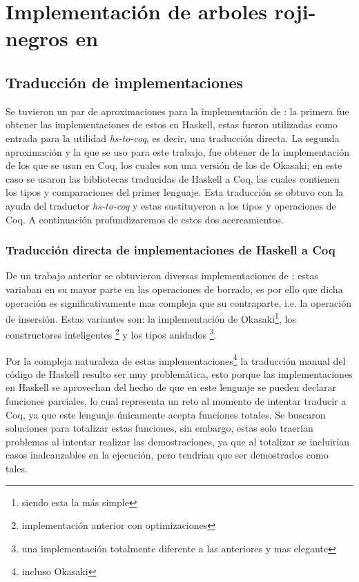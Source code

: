 \chapter{Implementación de arboles roji-negros en {\coq}}

\section{Traducción de implementaciones}
Se tuvieron un par de aproximaciones para la implementación de {\arns}: la primera fue obtener las
implementaciones de estos \cite{tesisG} en Haskell, estas fueron utilizadas como entrada para la
utilidad \textit{hs-to-coq}, es decir, una traducci\'on directa. La segunda aproximación y la que
se uso para este trabajo, fue obtener de \cite{MSetRBT} la implementaci\'on de los {\arns} que se
usan en Coq, los cuales son una versi\'on de los {\arns} de Okasaki; en este caso se usaron
las bibliotecas traducidas de Haskell a Coq, las cuales contienen los tipos y comparaciones del
primer lenguaje. Esta traducción se obtuvo con la ayuda del traductor \textit{hs-to-coq} y estas
sustituyeron a los tipos y operaciones de Coq. A continuación profundizaremos de estos 
dos acercamientos.

\subsection{Traducción directa de implementaciones de Haskell a Coq}
De un trabajo anterior \cite{tesisG} se obtuvieron diversas implementaciones de {\arns}; estas
variaban en su mayor parte en las operaciones de borrado, es por ello que dicha operación es
significativamente mas compleja que su contraparte, i.e. la operación de insersi\'on. Estas 
variantes son: la implementación de Okasaki\footnote{siendo esta la m\'as simple},
los constructores inteligentes \footnote{implementaci\'on anterior con optimizaciones} y los 
tipos anidados \footnote{una implementaci\'on totalmente diferente a las anteriores y mas elegante}.

Por la compleja naturaleza de estas implementaciones\footnote{incluso Okasaki} la traducción
manual del código de Haskell resulto ser muy problemática, esto porque las implementaciones en
Haskell se aprovechan del hecho de que en este lenguaje se pueden declarar funciones parciales, lo
cual representa un reto al momento de intentar traducir a Coq, ya que este lenguaje únicamente 
acepta funciones totales. Se buscaron soluciones para totalizar estas funciones, sin embargo, estas
solo traerían problemas al intentar realizar las demostraciones, ya que al totalizar se incluirian 
casos inalcanzables en la ejecuci\'on, pero tendrian que ser demostrados como tales.

